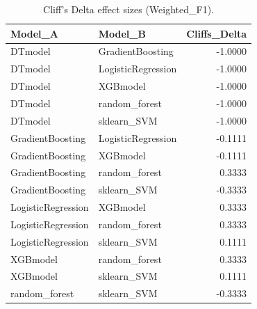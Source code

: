 \begin{table}[t]
\centering
\begin{tabular}{llr}
\toprule
Model_A & Model_B & Cliffs_Delta \\
\midrule
DTmodel & GradientBoosting & -1.0000 \\
DTmodel & LogisticRegression & -1.0000 \\
DTmodel & XGBmodel & -1.0000 \\
DTmodel & random_forest & -1.0000 \\
DTmodel & sklearn_SVM & -1.0000 \\
GradientBoosting & LogisticRegression & -0.1111 \\
GradientBoosting & XGBmodel & -0.1111 \\
GradientBoosting & random_forest & 0.3333 \\
GradientBoosting & sklearn_SVM & -0.3333 \\
LogisticRegression & XGBmodel & 0.3333 \\
LogisticRegression & random_forest & 0.3333 \\
LogisticRegression & sklearn_SVM & 0.1111 \\
XGBmodel & random_forest & 0.3333 \\
XGBmodel & sklearn_SVM & 0.1111 \\
random_forest & sklearn_SVM & -0.3333 \\
\bottomrule
\end{tabular}
\caption{Cliff's Delta effect sizes (Weighted_F1).}
\label{tab:cliffs_Weighted_F1}
\end{table}